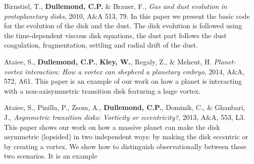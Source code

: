 \documentclass[10pt,fleqn,twoside]{article}
\begin{document}

\begin{literature}
\item Birnstiel, T., {\bf Dullemond, C.P.} \& Brauer, F., {\em Gas and dust
    evolution in protoplanetary disks}, 2010, A\&A 513, 79. In this paper we
  present the basic code for the evolution of the disk and the dust. The
  disk evolution is followed using the time-dependent viscous disk
  equations, the dust part follows the dust coagulation, fragmentation,
  settling and radial drift of the dust.
\item Ataiee, S., {\bf Dullemond, C.P.}, {\bf Kley, W.}, Regaly, Z., \&
  Meheut, H. {\em Planet-vortex interaction: How a vortex can shepherd a
    planetary embryo}, 2014, A\&A, 572, A61. This paper is an example of our
  work on how a planet is interacting with a non-axisymmetric transition
  disk featuring a huge vortex.
\item Ataiee, S., Pinilla, P., Zsom, A., {\bf Dullemond, C.P.}, Dominik, C.,
  \& Ghanbari, J., {\em Asymmetric transition disks: Vorticity or
    eccentricity?}, 2013, A\&A, 553, L3. This paper shows our work on how a
  massive planet can make the disk asymmetric (lopsided) in two independent
  ways: by making the disk eccentric or by creating a vortex. We show how to
  distinguish observationally between these two scenarios. It is an example

\end{literature}
\end{document}
